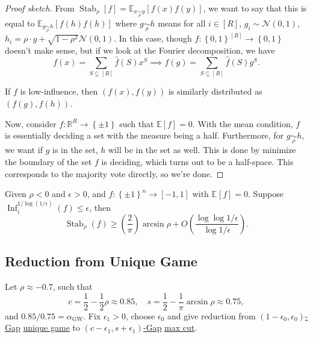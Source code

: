 \begin{proof}[Proof sketch]
	From \(\mathop{\mathrm{Stab}}_\rho [f] = \mathbb{E}_{x \underset{\rho }{\sim } y}\left[f(x) f(y) \right] \), we want to say that this is equal to \(\mathbb{E}_{g \underset{\rho }{\sim } h}\left[ f(h) f(h) \right] \) where \(g \underset{\rho }{\sim } h\) means for all \(i\in [R]\), \(g_i \sim \mathcal{N} (0, 1)\), \(h_i = \rho \cdot g + \sqrt{1 - \rho ^{2} }\mathcal{N} (0, 1) \). In this case, though \(f\colon \left\{ 0, 1 \right\} ^[R] \to \left\{ 0, 1 \right\} \) doesn't make sense, but if we look at the Fourier decomposition, we have
	\[
		f(x) = \sum_{S \subseteq [R]} \hat{f} (S) x^S \implies f(g) = \sum_{S \subseteq [R]} \hat{f} (S) g^S.
	\]

	\begin{remark}
		If \(f\) is low-influence, then \((f(x), f(y))\) is similarly distributed as \((f(g), f(h))\).
	\end{remark}
	Now, consider \(f\colon \mathbb{R} ^R \to \left\{ \pm 1 \right\} \) such that \(\mathbb{E}\left[f \right] =0\). With the mean condition, \(f\) is essentially deciding a set with the measure being a half. Furthermore, for \(g \underset{\rho }{\sim } h\), we want if \(g\) is in the set, \(h\) will be in the set as well. This is done by minimize the boundary of the set \(f\) is deciding, which turns out to be a half-space. This corresponds to the majority vote directly, so we're done.
\end{proof}

\begin{corollary}
	Given \(\rho < 0\) and \(\epsilon > 0\), and \(f\colon \left\{ \pm 1 \right\} ^n \to [-1, 1]\) with \(\mathbb{E}_{}\left[f \right] = 0\). Suppose \(\mathop{\mathrm{Inf}}_i^{1 / \log (1 / \epsilon )}(f)\leq \epsilon \), then
	\[
		\mathop{\mathrm{Stab}}\nolimits_\rho (f) \geq \left( \frac{2}{\pi } \right) \arcsin \rho + O\left( \frac{\log \log 1 / \epsilon }{\log 1 / \epsilon } \right).
	\]
\end{corollary}

\subsection{Reduction from Unique Game}
Let \(\rho \approx -0.7\), such that
\[
	c = \frac{1}{2} - \frac{1}{2}\rho \approx 0.85, \quad s = \frac{1}{2} - \frac{1}{\pi }\arcsin \rho \approx 0.75,
\]
and \(0.85 / 0.75 = \alpha _{\mathrm{GW} }\). Fix \(\epsilon _1 > 0\), choose \(\epsilon _0\) and give reduction from \hyperref[def:c-s-Gap]{\((1-\epsilon _0, \epsilon _0)\)-Gap} \hyperref[prb:unique-game]{unique game} to \hyperref[def:c-s-Gap]{\((c-\epsilon _1, s+\epsilon _1)\)-Gap} \hyperref[prb:max-cut]{max cut}.

